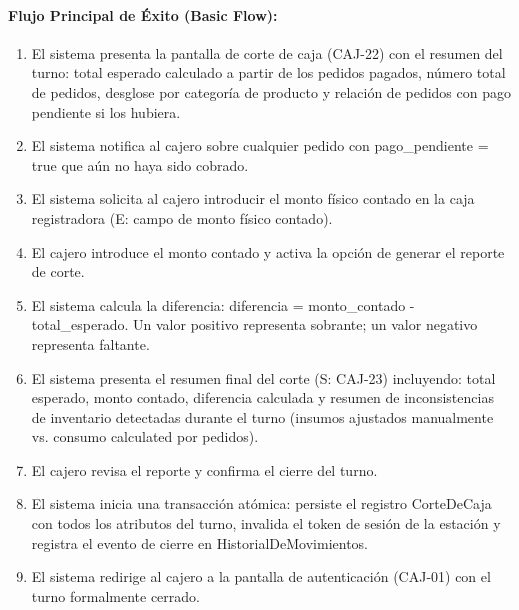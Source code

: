 \paragraph{Flujo Principal de Éxito (Basic Flow):}
\begin{enumerate}
    \item[I.] El sistema presenta la pantalla de corte de caja (CAJ-22) con el resumen del turno: total esperado calculado a partir de los pedidos pagados, número total de pedidos, desglose por categoría de producto y relación de pedidos con pago pendiente si los hubiera.
    \item[II.] El sistema notifica al cajero sobre cualquier pedido con pago\_pendiente = true que aún no haya sido cobrado.
    \item[III.] El sistema solicita al cajero introducir el monto físico contado en la caja registradora (E: campo de monto físico contado).
    \item[IV.] El cajero introduce el monto contado y activa la opción de generar el reporte de corte.
    \item[V.] El sistema calcula la diferencia: diferencia = monto\_contado - total\_esperado. Un valor positivo representa sobrante; un valor negativo representa faltante.
    \item[VI.] El sistema presenta el resumen final del corte (S: CAJ-23) incluyendo: total esperado, monto contado, diferencia calculada y resumen de inconsistencias de inventario detectadas durante el turno (insumos ajustados manualmente vs. consumo calculated por pedidos).
    \item[VII.] El cajero revisa el reporte y confirma el cierre del turno.
    \item[VIII.] El sistema inicia una transacción atómica: persiste el registro CorteDeCaja con todos los atributos del turno, invalida el token de sesión de la estación y registra el evento de cierre en HistorialDeMovimientos.
    \item[IX.] El sistema redirige al cajero a la pantalla de autenticación (CAJ-01) con el turno formalmente cerrado.
\end{enumerate}


